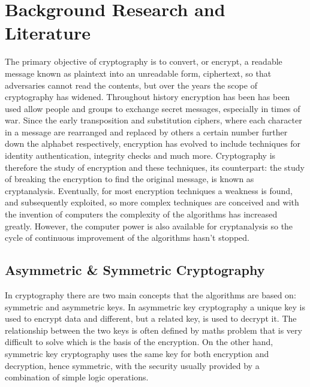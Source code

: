 \documentclass[12pt,twoside,a4paper]{report}
\begin{document}
    \chapter{Background Research and Literature}
    The primary objective of cryptography is to convert, or encrypt, a readable message known as plaintext into an unreadable form, ciphertext, so that adversaries cannot read the contents,  but over the years the scope of cryptography has widened. Throughout history encryption has been has been used allow people and groups to exchange secret messages, especially in times of war. Since the early transposition and substitution ciphers, where each character in a message are rearranged and replaced by others a certain number further down the alphabet respectively, encryption has evolved to include techniques for identity authentication, integrity checks and much more. Cryptography is therefore the study of encryption and these techniques, its counterpart: the study of breaking the encryption to find the original message, is known as cryptanalysis. Eventually, for most encryption techniques a weakness is found, and subsequently exploited, so more complex techniques are conceived and with the invention of computers the complexity of the algorithms has increased greatly. However, the computer power is also available for cryptanalysis so the cycle of continuous improvement of the algorithms hasn't stopped.
    
    \section{Asymmetric \& Symmetric Cryptography}
    In cryptography there are two main concepts that the algorithms are based on: symmetric and asymmetric keys. In asymmetric key cryptography a unique key is used to encrypt data and different, but a related key, is used to decrypt it. The relationship between the two keys is often defined by maths problem that is very difficult to solve which is the basis of the encryption. On the other hand, symmetric key cryptography uses the same key for both encryption and decryption, hence symmetric, with the security usually provided by a combination of simple logic operations.
    
\end{document}
